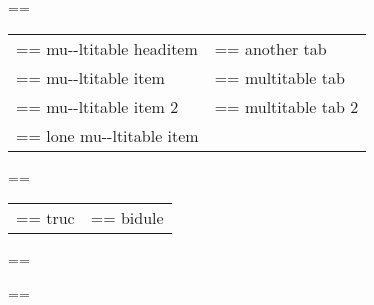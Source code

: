 \documentclass{book}
\makeatletter
\newenvironment{Texinfopreformatted}{%
  \par\GNUTobeylines\obeyspaces\frenchspacing\parskip=\z@\parindent=\z@}{}
{\catcode`\^^M=13 \gdef\GNUTobeylines{\catcode`\^^M=13 \def^^M{\null\par}}}
\newenvironment{Texinfoindented}{\begin{list}{}{}\item\relax}{\end{list}}
\renewcommand{\_}{\Texinfounderscore\discretionary{}{}{}}
\makeatother
\begin{document}
\begin{Texinfoindented}
\begin{Texinfopreformatted}%
\ttfamily 
\end{Texinfopreformatted}
\begin{tabular}{m{} m{}}%
\begin{Texinfopreformatted}%
\ttfamily mu{-}{-}ltitable headitem \end{Texinfopreformatted}&
\begin{Texinfopreformatted}%
\ttfamily another tab
\end{Texinfopreformatted}\\
\begin{Texinfopreformatted}%
\ttfamily mu{-}{-}ltitable item \end{Texinfopreformatted}&
\begin{Texinfopreformatted}%
\ttfamily multitable tab
\end{Texinfopreformatted}\\
\begin{Texinfopreformatted}%
\ttfamily mu{-}{-}ltitable item 2 \end{Texinfopreformatted}&
\begin{Texinfopreformatted}%
\ttfamily multitable tab 2
\index[cp]{index entry within multitable@index entry within multitable}%
\end{Texinfopreformatted}\\
\begin{Texinfopreformatted}%
\ttfamily lone mu{-}{-}ltitable item
\end{Texinfopreformatted}&\\
\end{tabular}%
\begin{Texinfopreformatted}%
\ttfamily 
\end{Texinfopreformatted}
\begin{tabular}{m{} m{}}%
\begin{Texinfopreformatted}%
\ttfamily truc \end{Texinfopreformatted}&
\begin{Texinfopreformatted}%
\ttfamily bidule
\end{Texinfopreformatted}\\
\end{tabular}%
\begin{Texinfopreformatted}%
\ttfamily 
\end{Texinfopreformatted}
\begin{Texinfoindented}
\begin{Texinfopreformatted}%

\end{Texinfopreformatted}
\end{Texinfoindented}
\end{Texinfoindented}
\end{document}
